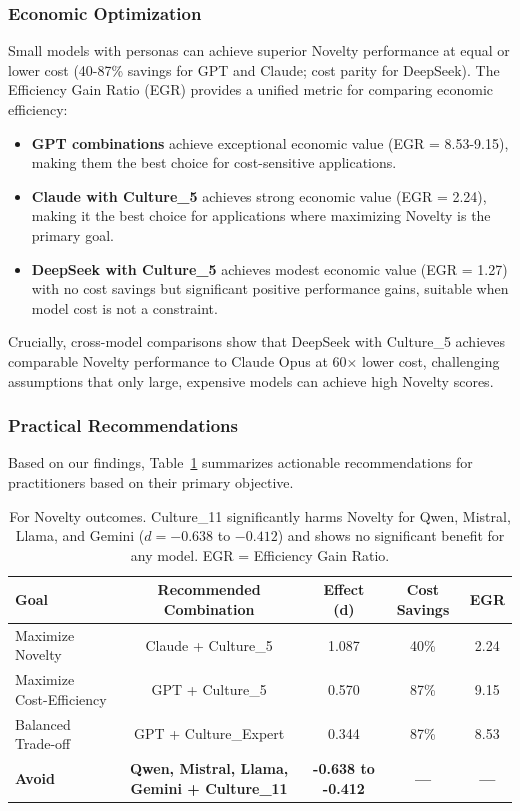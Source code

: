 \documentclass{article}
\begin{document}
\subsubsection{Economic Optimization}

Small models with personas can achieve superior Novelty performance at equal or lower cost (40-87\% savings for GPT and Claude; cost parity for DeepSeek). The Efficiency Gain Ratio (EGR) provides a unified metric for comparing economic efficiency:

\begin{itemize}
    \item \textbf{GPT combinations} achieve exceptional economic value (EGR = 8.53-9.15), making them the best choice for cost-sensitive applications.
    \item \textbf{Claude with Culture\_5} achieves strong economic value (EGR = 2.24), making it the best choice for applications where maximizing Novelty is the primary goal.
    \item \textbf{DeepSeek with Culture\_5} achieves modest economic value (EGR = 1.27) with no cost savings but significant positive performance gains, suitable when model cost is not a constraint.
\end{itemize}

Crucially, cross-model comparisons show that DeepSeek with Culture\_5 achieves comparable Novelty performance to Claude Opus at 60× lower cost, challenging assumptions that only large, expensive models can achieve high Novelty scores.

\subsubsection{Practical Recommendations}

Based on our findings, Table~\ref{tab:practical_recommendations} summarizes actionable recommendations for practitioners based on their primary objective.

\begin{table}[H]
\centering
\caption{Practical Recommendations for Persona Selection}
\label{tab:practical_recommendations}
\begin{tabular}{lcccc}
\toprule
\textbf{Goal} & \textbf{Recommended Combination} & \textbf{Effect (d)} & \textbf{Cost Savings} & \textbf{EGR} \\
\midrule
Maximize Novelty & Claude + Culture\_5 & 1.087 & 40\% & 2.24 \\
Maximize Cost-Efficiency & GPT + Culture\_5 & 0.570 & 87\% & 9.15 \\
Balanced Trade-off & GPT + Culture\_Expert & 0.344 & 87\% & 8.53 \\
\midrule
\textbf{Avoid} & \textbf{Qwen, Mistral, Llama, Gemini + Culture\_11} & \textbf{-0.638 to -0.412} & \textbf{---} & \textbf{---} \\
\bottomrule
\end{tabular}
\caption*{\footnotesize For Novelty outcomes. Culture\_11 significantly harms Novelty for Qwen, Mistral, Llama, and Gemini (\(d = -0.638\) to \(-0.412\)) and shows no significant benefit for any model. EGR = Efficiency Gain Ratio.}
\end{table}
\end{document}
